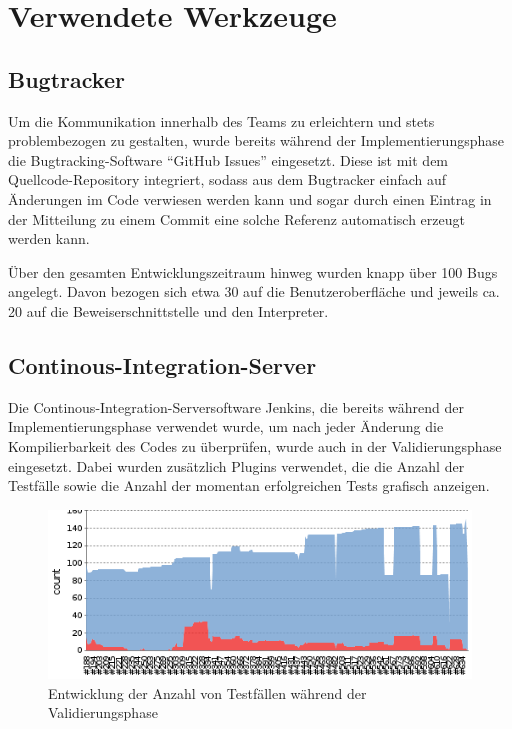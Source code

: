 \section{Verwendete Werkzeuge}
\subsection{Bugtracker}
Um die Kommunikation innerhalb des Teams zu erleichtern und stets problembezogen zu gestalten, wurde bereits während der Implementierungsphase  die Bugtracking-Software "`GitHub Issues"' eingesetzt. Diese ist mit dem Quellcode-Repository integriert, sodass aus dem Bugtracker einfach auf Änderungen im Code verwiesen werden kann und sogar durch einen Eintrag in der Mitteilung zu einem Commit eine solche Referenz automatisch erzeugt werden kann.

Über den gesamten Entwicklungszeitraum hinweg wurden knapp über 100 Bugs angelegt. Davon bezogen sich etwa 30 auf die Benutzeroberfläche und jeweils ca. 20 auf die Beweiserschnittstelle und den Interpreter.

\subsection{Continous-Integration-Server}
Die Continous-Integration-Serversoftware Jenkins, die bereits während der Implementierungsphase verwendet wurde, um nach jeder Änderung die Kompilierbarkeit des Codes zu überprüfen, wurde auch in der Validierungsphase eingesetzt. Dabei wurden zusätzlich Plugins verwendet, die die Anzahl der Testfälle sowie die Anzahl der momentan erfolgreichen Tests grafisch anzeigen.

\begin{center}
	\begin{figure}[h] %
		\includegraphics[width=13cm]{images/jenkins-test-trend.png}
		\caption{Entwicklung der Anzahl von Testfällen während der Validierungsphase}
	\end{figure}
\end{center}
